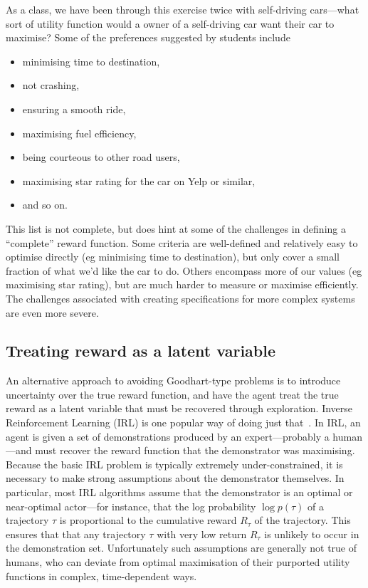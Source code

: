 \documentclass[11pt]{article}
\begin{document}
As a class, we have been through this exercise twice with self-driving
cars---what sort of utility function would a owner of a self-driving car want
their car to maximise?
%
Some of the preferences suggested by students include
%
\begin{itemize}
\item minimising time to destination,
\item not crashing,
\item ensuring a smooth ride,
\item maximising fuel efficiency,
\item being courteous to other road users,
\item maximising star rating for the car on Yelp or similar,
\item and so on.
\end{itemize}
%
This list is not complete, but does hint at some of the challenges in defining a
``complete'' reward function.
%
Some criteria are well-defined and relatively easy to optimise directly (eg
minimising time to destination), but only cover a small fraction of what we'd
like the car to do.
%
Others encompass more of our values (eg maximising star rating), but are much
harder to measure or maximise efficiently.
%
The challenges associated with creating specifications for more complex systems
are even more severe.

\subsection{Treating reward as a latent variable}


An alternative approach to avoiding Goodhart-type problems is to introduce
uncertainty over the true reward function, and have the agent treat the true
reward as a latent variable that must be recovered through exploration.
%
Inverse Reinforcement Learning (IRL) is one popular way of doing just
that~\cite{ng00algorithms}.
%
In IRL, an agent is given a set of demonstrations produced by an
expert---probably a human---and must recover the reward function that the
demonstrator was maximising.
%
Because the basic IRL problem is typically extremely under-constrained, it is
necessary to make strong assumptions about the demonstrator themselves.
%
In particular, most IRL algorithms assume that the demonstrator is an optimal or
near-optimal actor---for instance, that the log probability $\log p(\tau)$ of a
trajectory $\tau$ is proportional to the cumulative reward $R_\tau$ of the
trajectory.
%
This ensures that that any trajectory $\tau$ with very low return $R_\tau$ is
unlikely to occur in the demonstration set.
%
Unfortunately such assumptions are generally not true of humans, who can deviate
from optimal maximisation of their purported utility functions in complex,
time-dependent ways.
\end{document}
